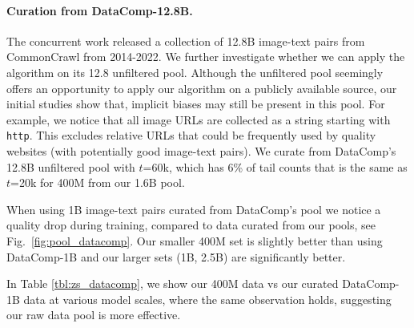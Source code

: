 \documentclass{article} %
\begin{document}
\paragraph{Curation from DataComp-12.8B.}
The concurrent work \cite{gadre2023datacomp} released a collection of 12.8B image-text pairs from CommonCrawl from 2014-2022.
We further investigate whether we can apply the algorithm on its 12.8 unfiltered pool. 
Although the unfiltered pool seemingly offers an opportunity to apply our algorithm on a publicly available source, our initial studies show that, implicit biases may still be present in this pool. For example, we notice that all image URLs are collected as a string starting with \texttt{http}. This excludes relative URLs that could be frequently used by quality websites
(with potentially good image-text pairs).
We curate from DataComp's 12.8B unfiltered pool with $t$=60k, which has 6\% of tail counts that is the same as $t$=20k for 400M from our 1.6B pool. 

 When using 1B image-text pairs curated from DataComp's pool we notice a quality drop during training, compared to data curated from our pools, see  Fig.~\ref{fig:pool_datacomp}. Our smaller 400M set is slightly better than using DataComp-1B and our larger sets (1B, 2.5B) are significantly better. 

In Table \ref{tbl:zs_datacomp}, we show our 400M data vs our curated DataComp-1B data at various model scales, where the same observation holds, suggesting our raw data pool is more effective. 
\end{document}
